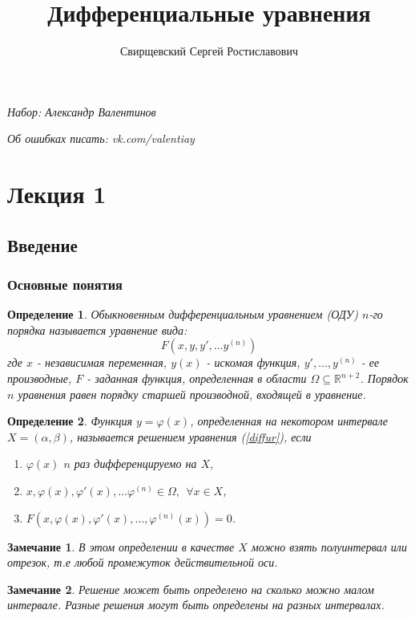 \documentclass{article}
\author{Свирщевский Сергей Ростиславович}
\title{Дифференциальные уравнения}
\newtheorem*{df}{Определение}
\newtheorem*{ntc}{Замечание}
\begin{document}
  \begin{titlepage}
  \maketitle
  \begin{center}
  {\itshape\footnotesize Набор: Александр Валентинов}
  
  {\itshape\footnotesize Об ошибках писать: vk.com/valentiay}
  \end{center}
  \tableofcontents
  \vfill
  \end{titlepage}
  
  \section{Лекция 1}
  \subsection{Введение}
  \subsubsection{Основные понятия}
  \begin{df}
  Обыкновенным дифференциальным уравнением {(ОДУ)} $n$-го порядка называется уравнение вида:
  \begin{equation}
  \label{diffur}
  F(x, y, y', \ldots y^{(n)})
  \end{equation}
  где $x$ - независимая переменная, $y(x)$ - искомая функция, $ y', \ldots, y^{(n)} $ - ее производные, $F$ - заданная функция, определенная в области $\Omega \subseteq \mathbb{R}^{n+2}$. Порядок $n$ уравнения равен порядку старшей производной, входящей в уравнение. 
  \end{df}
  
  \begin{df}
  Функция $y = \varphi(x)$, определенная на некотором интервале $X = (\alpha, \beta)$, называется решением уравнения (\ref{diffur}), если 
  \begin{enumerate}
  \item $\varphi(x)$ $n$ раз дифференцируемо на $X$,
  \item $x, \varphi(x), \varphi'(x), \ldots \varphi^{(n)} \in \Omega,~~ \forall x \in X$,
  \item $F(x, \varphi(x), \varphi'(x), \ldots, \varphi^{(n)}(x)) = 0$.
  \end{enumerate}
  \end{df}
  \begin{ntc}
  В этом определении в качестве $X$ можно взять полуинтервал или отрезок, т.е любой промежуток действительной оси.
  \end{ntc}
  \begin{ntc}
  Решение может быть определено на сколько можно малом интервале. Разные решения могут быть определены на разных интервалах.
  \end{ntc}
  
\end{document}
